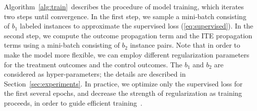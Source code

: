 Algorithm~\ref{alg:train}~describes the procedure of model training, which iterates two steps until convergence. 
In the first step, we sample a mini-batch consisting of $b_1$ labeled instances to approximate the supervised loss (\ref{eq:supervised}).
In the second step, we compute the outcome propagation term and the ITE propagation terms using a mini-batch consisting of $b_2$ instance pairs. 
Note that in order to make the model more flexible, we can employ different regularization parameters for the treatment outcomes and the control outcomes. 
The $b_1$ and $b_2$ are considered as hyper-parameters; the details are described in Section~\ref{sec:experiments}.
In practice, we optimize only the supervised loss for the first several epochs, and decrease the strength of regularization as training proceeds, in order to guide efficient training~\cite{weston2012deep}.  
